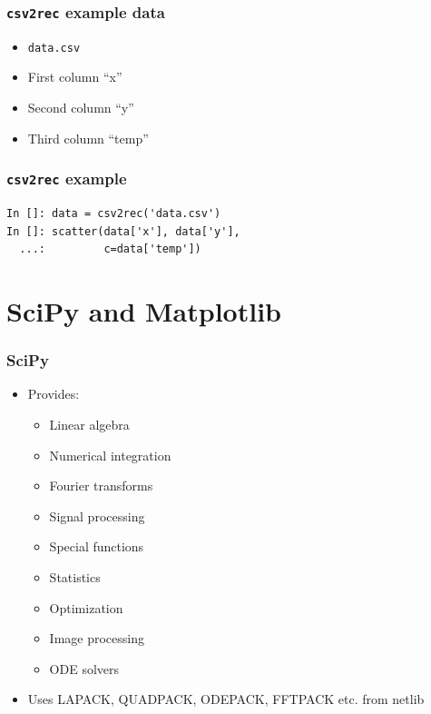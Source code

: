 \documentclass[14pt,compress]{beamer}
\newcounter{time}
\newcommand{\inctime}[1]{\addtocounter{time}{#1}{\tiny \thetime\ m}}
\newcommand{\typ}[1]{\lstinline{#1}}
\begin{document}
\begin{frame}[fragile]
    \frametitle{\typ{csv2rec} example data}
    \begin{itemize}
        \item \typ{data.csv}
        \item First column ``x''
        \item Second column ``y''
        \item Third column ``temp''
    \end{itemize}
\end{frame}

\begin{frame}[fragile]
    \frametitle{\typ{csv2rec} example}
    \begin{lstlisting}
In []: data = csv2rec('data.csv')
In []: scatter(data['x'], data['y'], 
  ...:         c=data['temp'])
    \end{lstlisting}
    \inctime{5}
\end{frame}


\section{SciPy and Matplotlib}
\begin{frame}[plain]
  \frametitle{SciPy}
  \begin{itemize}
  \item Provides:
    \begin{itemize}
    \item Linear algebra
    \item Numerical integration
    \item Fourier transforms
    \item Signal processing
    \item Special functions
    \item Statistics
    \item Optimization
    \item Image processing
    \item ODE solvers
    \end{itemize}
  \item Uses LAPACK, QUADPACK, ODEPACK, FFTPACK etc. from netlib
  \end{itemize}
\end{frame}
\end{document}
